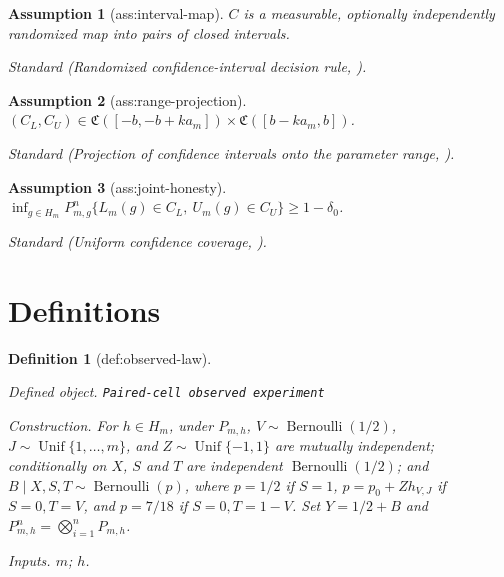 \documentclass{article}
\newtheorem{assumption}{Assumption}
\newtheorem{definition}{Definition}
\begin{document}
\begin{assumption}[ass:interval-map]\label{ass:interval-map}
\(C\) is a measurable, optionally independently randomized map into pairs of closed intervals.
\par\smallskip\noindent\emph{Standard} (Randomized confidence-interval decision rule, \cite{Low1997}).
\end{assumption}

\begin{assumption}[ass:range-projection]\label{ass:range-projection}
\((C_L,C_U)\in\mathfrak C([-b,-b+ka_m])\times\mathfrak C([b-ka_m,b])\).
\par\smallskip\noindent\emph{Standard} (Projection of confidence intervals onto the parameter range, \cite{CaiLowXia2013}).
\end{assumption}

\begin{assumption}[ass:joint-honesty]\label{ass:joint-honesty}
\(\inf_{g\in H_m}P_{m,g}^{n}\{L_m(g)\in C_L,\ U_m(g)\in C_U\}\ge1-\delta_0\).
\par\smallskip\noindent\emph{Standard} (Uniform confidence coverage, \cite{Low1997}).
\end{assumption}

\section{Definitions}

\begin{definition}[def:observed-law]\label{def:observed-law}
\par\smallskip\noindent\emph{Defined object.} \texttt{Paired-\allowbreak{}cell observed experiment}
\par\smallskip\noindent\emph{Construction.} For \(h\in H_m\), under \(P_{m,h}\), \(V\sim\operatorname{Bernoulli}(1/2)\), \(J\sim\operatorname{Unif}\{1,\ldots,m\}\), and \(Z\sim\operatorname{Unif}\{-1,1\}\) are mutually independent; conditionally on \(X\), \(S\) and \(T\) are independent \(\operatorname{Bernoulli}(1/2)\); and \(B\mid X,S,T\sim\operatorname{Bernoulli}(p)\), where \(p=1/2\) if \(S=1\), \(p=p_0+Zh_{V,J}\) if \(S=0,T=V\), and \(p=7/18\) if \(S=0,T=1-V\). Set \(Y=1/2+B\) and \(P_{m,h}^{n}=\bigotimes_{i=1}^{n}P_{m,h}\).
\par\smallskip\noindent\emph{Inputs.} \(m\); \(h\).
\end{definition}
\end{document}
